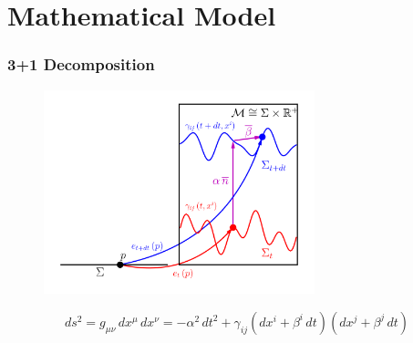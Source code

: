 \documentclass{beamer}
\begin{document}
\section{Mathematical Model}

\begin{frame}
\frametitle{3+1 Decomposition}

  \begin{figure}[htb!]
    \centering
    \includegraphics[width=0.7\textwidth]{fig.1p1.png}
  \end{figure}

  \vspace{-2em}

  \begin{equation*}
    ds^{2}
    =g_{\mu\nu}\,dx^{\mu}\,dx^{\nu}
    =-\alpha^{2}\,dt^{2}
     +\gamma_{ij}\left(dx^{i}+\beta^{i}\,dt\right)
                 \left(dx^{j}+\beta^{j}\,dt\right)
  \end{equation*}

\end{frame}
\end{document}
